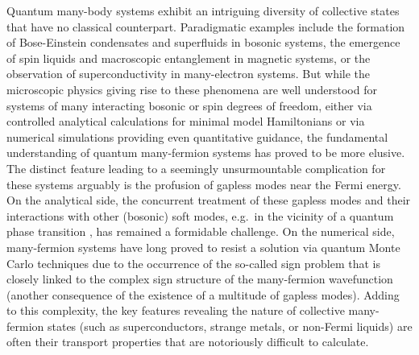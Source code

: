 \documentclass[amsmath,amssymb, aps, prx, longbibliography, twocolumn]{revtex4-1}
\begin{document}
Quantum many-body systems exhibit an intriguing diversity of collective states that have no classical counterpart.
Paradigmatic examples include the formation of Bose-Einstein condensates and superfluids in bosonic systems, 
the emergence of spin liquids and macroscopic entanglement in magnetic systems, 
or the observation of superconductivity in many-electron systems. 
But while the microscopic physics giving rise to these phenomena are well understood for systems 
of many interacting bosonic or spin degrees of freedom, 
either via controlled analytical calculations for minimal model Hamiltonians or via numerical simulations
providing even quantitative guidance, the fundamental understanding of quantum many-fermion systems
has proved to be more elusive. The distinct feature leading to a seemingly unsurmountable complication
for these systems arguably is the profusion of gapless modes near the Fermi energy. 
On the analytical side, the concurrent treatment of these gapless modes and their interactions with other (bosonic) soft modes,
e.g.~in the vicinity of a quantum phase transition \cite{Hertz1976,Millis1993}, has remained a formidable challenge.
On the numerical side, many-fermion systems have long proved to resist a solution via quantum Monte Carlo techniques
due to the occurrence of the so-called sign problem that is closely linked to the complex sign structure of the 
many-fermion wavefunction (another consequence of the existence of a multitude of gapless modes).
Adding to this complexity, the key features revealing the nature of collective many-fermion states 
(such as superconductors, strange metals, or non-Fermi liquids) are often their transport properties
that are notoriously difficult to calculate.   
\end{document}
